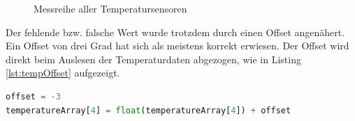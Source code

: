 \begin{figure}[htbp]
	\centering
	\caption{Messreihe aller Temperatursensoren}
	\label{img:tempSensoren}
\end{figure}

\noindent
Der fehlende bzw. falsche Wert wurde trotzdem durch einen Offset angenähert. Ein Offset von drei Grad hat sich als meistens korrekt erwiesen. Der Offset wird direkt beim Auslesen der Temperaturdaten abgezogen, wie in Listing \ref{lst:tempOffset} aufgezeigt.

\vspace{3mm}
\begin{lstlisting}[label=lst:tempOffset,caption=Offset des defekten Temperatusensors, language=Python, style=py]
offset = -3
temperatureArray[4] = float(temperatureArray[4]) + offset
\end{lstlisting}
